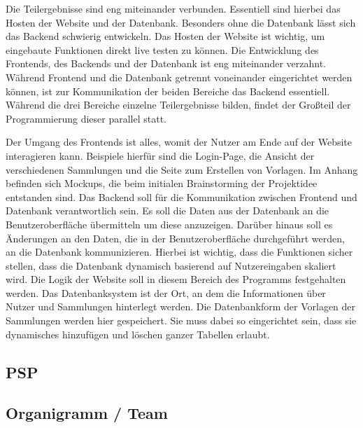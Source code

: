 \documentclass[a4paper, 12pt]{article}
\begin{document}
    Die Teilergebnisse sind eng miteinander verbunden.
    Essentiell sind hierbei das Hosten der Website und der Datenbank.
    Besonders ohne die Datenbank lässt sich das Backend schwierig entwickeln.
    Das Hosten der Website ist wichtig, um eingebaute Funktionen direkt live testen zu können.
    Die Entwicklung des Frontends, des Backends und der Datenbank ist eng miteinander verzahnt.
    Während Frontend und die Datenbank getrennt voneinander eingerichtet werden können, ist zur Kommunikation der beiden Bereiche das Backend essentiell.
    Während die drei Bereiche einzelne Teilergebnisse bilden, findet der Großteil der Programmierung dieser parallel statt.

    Der Umgang des Frontends ist alles, womit der Nutzer am Ende auf der Website interagieren kann.
    Beispiele hierfür sind die Login-Page, die Ansicht der verschiedenen Sammlungen und die Seite zum Erstellen von Vorlagen.
    Im Anhang befinden sich Mockups, die beim initialen Brainstorming der Projektidee entstanden sind.
    Das Backend soll für die Kommunikation zwischen Frontend und Datenbank verantwortlich sein.
    Es soll die Daten aus der Datenbank an die Benutzeroberfläche übermitteln um diese anzuzeigen.
    Darüber hinaus soll es Änderungen an den Daten, die in der Benutzeroberfläche durchgeführt werden, an die Datenbank kommunizieren.
    Hierbei ist wichtig, dass die Funktionen sicher stellen, dass die Datenbank dynamisch basierend auf Nutzereingaben skaliert wird.
    Die Logik der Website soll in diesem Bereich des Programms festgehalten werden.
    Das Datenbanksystem ist der Ort, an dem die Informationen über Nutzer und Sammlungen hinterlegt werden.
    Die Datenbankform der Vorlagen der Sammlungen werden hier gespeichert.
    Sie muss dabei so eingerichtet sein, dass sie dynamisches hinzufügen und löschen ganzer Tabellen erlaubt.

    \subsection{PSP}
    
    \subsection{Organigramm / Team}
\end{document}
